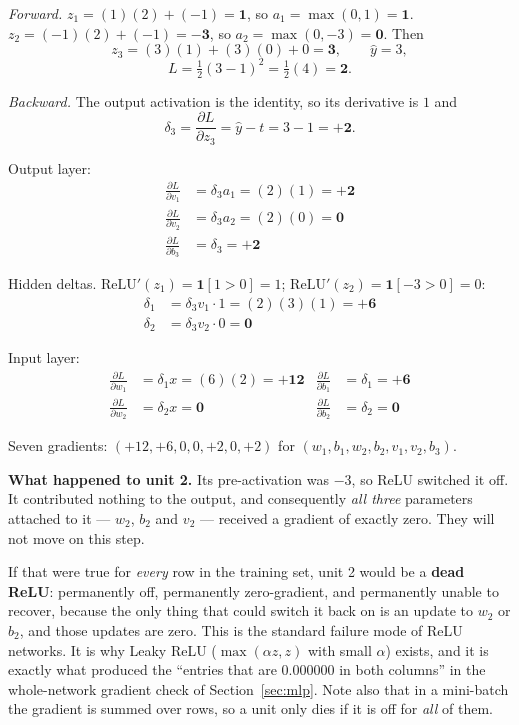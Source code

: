 \documentclass[11pt]{article}
\begin{document}
\emph{Forward.} $z_1 = (1)(2) + (-1) = \mathbf{1}$, so $a_1 = \max(0,1) =
\mathbf{1}$. $z_2 = (-1)(2) + (-1) = \mathbf{-3}$, so $a_2 = \max(0,-3) =
\mathbf{0}$. Then
\[
  z_3 = (3)(1) + (3)(0) + 0 = \mathbf{3}, \qquad \hat y = 3,
\]
\[
  L = \tfrac12(3 - 1)^2 = \tfrac12(4) = \mathbf{2}.
\]

\emph{Backward.} The output activation is the identity, so its derivative is
$1$ and
\[
  \delta_3 = \frac{\partial L}{\partial z_3} = \hat y - t = 3 - 1
  = \mathbf{+2}.
\]

Output layer:
\begin{align*}
  \frac{\partial L}{\partial v_1} &= \delta_3 a_1 = (2)(1) = \mathbf{+2}\\
  \frac{\partial L}{\partial v_2} &= \delta_3 a_2 = (2)(0) = \mathbf{0}\\
  \frac{\partial L}{\partial b_3} &= \delta_3 = \mathbf{+2}
\end{align*}

Hidden deltas. $\mathrm{ReLU}'(z_1) = \mathbf{1}[1 > 0] = 1$;
$\mathrm{ReLU}'(z_2) = \mathbf{1}[-3 > 0] = 0$:
\begin{align*}
  \delta_1 &= \delta_3 v_1 \cdot 1 = (2)(3)(1) = \mathbf{+6}\\
  \delta_2 &= \delta_3 v_2 \cdot 0 = \mathbf{0}
\end{align*}

Input layer:
\begin{align*}
  \frac{\partial L}{\partial w_1} &= \delta_1 x = (6)(2) = \mathbf{+12}
  & \frac{\partial L}{\partial b_1} &= \delta_1 = \mathbf{+6}\\
  \frac{\partial L}{\partial w_2} &= \delta_2 x = \mathbf{0}
  & \frac{\partial L}{\partial b_2} &= \delta_2 = \mathbf{0}
\end{align*}

Seven gradients: $(+12, +6, 0, 0, +2, 0, +2)$ for
$(w_1, b_1, w_2, b_2, v_1, v_2, b_3)$.

\textbf{What happened to unit 2.} Its pre-activation was $-3$, so ReLU
switched it off. It contributed nothing to the output, and consequently
\emph{all three} parameters attached to it --- $w_2$, $b_2$ and $v_2$ ---
received a gradient of exactly zero. They will not move on this step.

If that were true for \emph{every} row in the training set, unit 2 would be a
\textbf{dead ReLU}: permanently off, permanently zero-gradient, and
permanently unable to recover, because the only thing that could switch it
back on is an update to $w_2$ or $b_2$, and those updates are zero. This is
the standard failure mode of ReLU networks. It is why Leaky ReLU
($\max(\alpha z, z)$ with small $\alpha$) exists, and it is exactly what
produced the ``entries that are $0.000000$ in both columns'' in the
whole-network gradient check of Section~\ref{sec:mlp}. Note also that in a
mini-batch the gradient is summed over rows, so a unit only dies if it is off
for \emph{all} of them.
\end{document}
